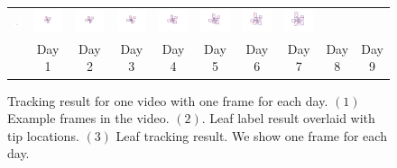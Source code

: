 \begin{figure}
\begin{centering}
\begin{tabular}{c c@{} c@{} c@{} c@{} c@{} c@{} c@{} c@{} c@{}}
\includegraphics[trim= 110 100 170 10, clip, width=.1\textwidth]{Figures/trackExample/3_2.pdf}&
\includegraphics[trim= 110 100 170 10, clip, width=.1\textwidth]{Figures/trackExample/3_3.pdf}&
\includegraphics[trim= 110 100 170 10, clip, width=.1\textwidth]{Figures/trackExample/3_4.pdf}&
\includegraphics[trim= 110 100 170 10, clip, width=.1\textwidth]{Figures/trackExample/3_5.pdf}&
\includegraphics[trim= 110 100 170 10, clip, width=.1\textwidth]{Figures/trackExample/3_6.pdf}&
\includegraphics[trim= 110 100 170 10, clip, width=.1\textwidth]{Figures/trackExample/3_7.pdf}&
\includegraphics[trim= 110 100 170 10, clip, width=.1\textwidth]{Figures/trackExample/3_8.pdf}&
\includegraphics[trim= 110 100 170 10, clip, width=.1\textwidth]{Figures/trackExample/3_9.pdf}\\

 & Day 1 & Day 2 & Day 3 & Day 4 & Day 5 & Day 6 & Day 7 & Day 8 & Day 9 \\
\end{tabular}
\caption{Tracking result for one video with one frame for each day. $(1)$ Example frames in the video.  $(2)$. Leaf label result overlaid with tip locations. $(3)$ Leaf tracking result. We show one frame for each day. }
\label{fig:trackExample}
\end{centering}
\end{figure}


